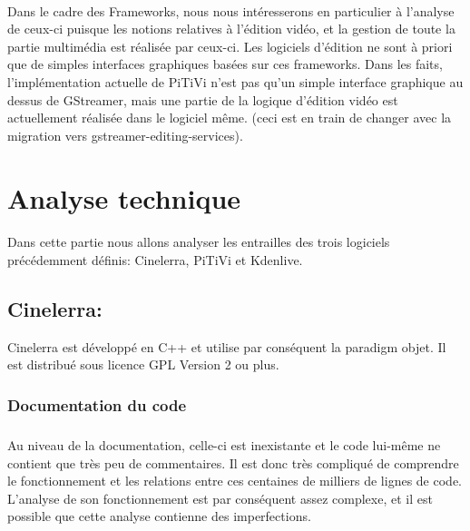 \paragraph {}

Dans le cadre des Frameworks, nous nous intéresserons en particulier
à l'analyse de ceux-ci puisque les notions relatives à l'édition
vidéo, et la gestion de toute la partie multimédia est réalisée
par ceux-ci. Les logiciels d'édition ne sont à priori que de simples
interfaces graphiques basées sur ces frameworks. Dans les faits,
l'implémentation actuelle de PiTiVi n'est pas qu'un simple interface
graphique au dessus de GStreamer, mais une partie de la
logique d'édition vidéo est actuellement réalisée dans le logiciel même.
(ceci est en train de changer avec la migration \cite{PitviPortToGes}
vers gstreamer-editing-services\cite{PresentationOfGes}).

\newpage \section{Analyse technique}

\paragraph {}

Dans cette partie nous allons analyser les entrailles %
des trois logiciels
précédemment définis: Cinelerra, PiTiVi et Kdenlive.

\subsection{Cinelerra:}

Cinelerra est développé en C++ et utilise par conséquent la paradigm
objet.  Il est distribué sous licence GPL Version 2 ou plus.

\subsubsection{Documentation du code}

\subparagraph{}

Au niveau de la documentation, celle-ci est inexistante et le code
lui-même ne contient que très peu de commentaires. Il est donc très
compliqué de comprendre le fonctionnement et les relations entre ces
centaines de milliers de lignes de code. L'analyse de son fonctionnement
est par conséquent assez complexe, et il est possible que cette analyse
contienne des imperfections.

